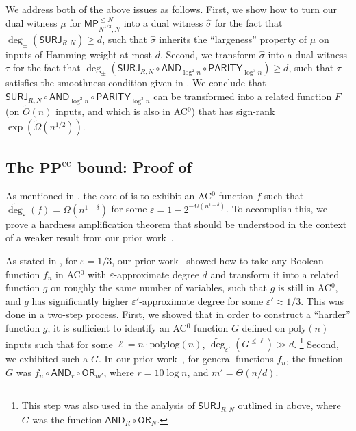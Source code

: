 \documentclass{toc}
\newcommand{\poly}{\mathrm{poly}}
\newcommand{\polylog}{\mathrm{polylog}}
\newcommand{\SURJ}{\mathsf{ SURJ}}
\newcommand{\OR}{\mathsf{ OR}}
\newcommand{\PPcc}{\mathbf{PP}^{\text{cc}}}
\newcommand{\eps}{\varepsilon}
\newcommand{\adeg}{\widetilde{\operatorname{deg}}}
\newcommand{\AND}{\mathsf{AND}}
\newcommand{\PARITY}{\mathsf{PARITY}}
\begin{document}
We address both of the above issues as follows. First, we show how to turn our dual witness $\mu$ for $\mathsf{MP}_{N^{1/2}, N}^{\leq N}$
into a dual witness $\hat{\sigma}$
for the fact that $\deg_{\pm}\left(\SURJ_{R, N}\right)\geq d$, such that $\hat{\sigma}$ inherits the ``largeness'' property of $\mu$ on inputs of Hamming weight at most $d$. 
Second, we transform $\hat{\sigma}$ into a dual witness $\tau$ for the fact that $\deg_{\pm}\left(\SURJ_{R, N} \circ \AND_{\log^2 n} \circ \PARITY_{\log^3 n}\right)\geq d$, such
that $\tau$ satisfies the smoothness condition given in . 
We conclude that $\SURJ_{R, N} \circ \AND_{\log^2 n} \circ \PARITY_{\log^3 n}$ can be transformed into
a related function $F$ (on $\tilde{O}(n)$ inputs, and which is also in AC$^0$) that has sign-rank $\exp(\tilde{\Omega}(n^{1/2}))$.

\label{precedingsection}
\subsection{The \texorpdfstring{$\PPcc$}{PPcc} bound: 
Proof of }
\label{s:hardnessamps}
As mentioned in , the core of  is to exhibit an
AC$^0$ function $f$ such that $\adeg_{\eps}(f) = \Omega(n^{1-\delta})$
for some $\eps= 1-2^{-\Omega(n^{1-\delta})}$. To accomplish this, we prove a hardness
amplification theorem that should be understood in the context of a weaker result from our prior work~\cite{adegsurj}.

As stated in , for $\eps=1/3$, our prior work~\cite{adegsurj} showed how to take any Boolean function $f_n$ in AC$^0$ 
with $\eps$-approximate degree $d$ and transform it into a related function $g$ on roughly the same number of variables, such that $g$ is still in AC$^0$, and $g$ has significantly higher $\eps'$-approximate degree for some $\eps' \approx 1/3$. %
This was done in a two-step process. First, we showed
that in order to construct a ``harder'' function $g$, it is sufficient to identify an AC$^0$ function $G$ defined on $\poly(n)$ inputs
such that for some $\ell=n\cdot\polylog(n)$, $\adeg_{\eps'}(G^{\leq \ell}) \gg d$.
\footnote{This step was also
	used in the analysis of $\SURJ_{R, N}$ outlined in  above, where $G$ was the function $\AND_R \circ \OR_N$.} 
Second, we exhibited such a $G$. 
In our prior %
work~\cite{adegsurj, bkt}, for general functions $f_n$, 
the function $G$ was $f_n \circ \AND_r \circ \OR_{m'}$, where $r=10 \log n$, and $m'=\Theta(n/d)$. 
\end{document}
